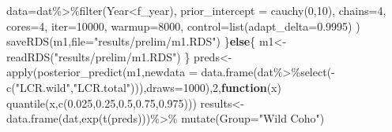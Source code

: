 \documentclass[
]{article}
\newenvironment{Shaded}{\begin{snugshade}}{\end{snugshade}}
\newcommand{\AttributeTok}[1]{\textcolor[rgb]{0.77,0.63,0.00}{#1}}
\newcommand{\ControlFlowTok}[1]{\textcolor[rgb]{0.13,0.29,0.53}{\textbf{#1}}}
\newcommand{\DecValTok}[1]{\textcolor[rgb]{0.00,0.00,0.81}{#1}}
\newcommand{\FloatTok}[1]{\textcolor[rgb]{0.00,0.00,0.81}{#1}}
\newcommand{\FunctionTok}[1]{\textcolor[rgb]{0.00,0.00,0.00}{#1}}
\newcommand{\NormalTok}[1]{#1}
\newcommand{\OtherTok}[1]{\textcolor[rgb]{0.56,0.35,0.01}{#1}}
\newcommand{\SpecialCharTok}[1]{\textcolor[rgb]{0.00,0.00,0.00}{#1}}
\newcommand{\StringTok}[1]{\textcolor[rgb]{0.31,0.60,0.02}{#1}}
\begin{document}
\begin{Shaded}
\begin{Highlighting}[]
             \AttributeTok{data=}\NormalTok{dat}\SpecialCharTok{\%\textgreater{}\%}\FunctionTok{filter}\NormalTok{(Year}\SpecialCharTok{\textless{}}\NormalTok{f\_year),}
             \AttributeTok{prior\_intercept =} \FunctionTok{cauchy}\NormalTok{(}\DecValTok{0}\NormalTok{,}\DecValTok{10}\NormalTok{),}
             \AttributeTok{chains=}\DecValTok{4}\NormalTok{,}
             \AttributeTok{cores=}\DecValTok{4}\NormalTok{,}
             \AttributeTok{iter=}\DecValTok{10000}\NormalTok{,}
             \AttributeTok{warmup=}\DecValTok{8000}\NormalTok{,}
             \AttributeTok{control=}\FunctionTok{list}\NormalTok{(}\AttributeTok{adapt\_delta=}\FloatTok{0.9995}\NormalTok{)}
\NormalTok{  )}
  \FunctionTok{saveRDS}\NormalTok{(m1,}\AttributeTok{file=}\StringTok{"results/prelim/m1.RDS"}\NormalTok{)}
\NormalTok{\}}\ControlFlowTok{else}\NormalTok{\{}
\NormalTok{    m1}\OtherTok{\textless{}{-}}\FunctionTok{readRDS}\NormalTok{(}\StringTok{"results/prelim/m1.RDS"}\NormalTok{)}
\NormalTok{  \}}
\NormalTok{preds}\OtherTok{\textless{}{-}}\FunctionTok{apply}\NormalTok{(}\FunctionTok{posterior\_predict}\NormalTok{(m1,}\AttributeTok{newdata =} \FunctionTok{data.frame}\NormalTok{(dat}\SpecialCharTok{\%\textgreater{}\%}\FunctionTok{select}\NormalTok{(}\SpecialCharTok{{-}}\FunctionTok{c}\NormalTok{(}\StringTok{"LCR.wild"}\NormalTok{,}\StringTok{"LCR.total"}\NormalTok{))),}\AttributeTok{draws=}\DecValTok{1000}\NormalTok{),}\DecValTok{2}\NormalTok{,}\ControlFlowTok{function}\NormalTok{(x) }\FunctionTok{quantile}\NormalTok{(x,}\FunctionTok{c}\NormalTok{(}\FloatTok{0.025}\NormalTok{,}\FloatTok{0.25}\NormalTok{,}\FloatTok{0.5}\NormalTok{,}\FloatTok{0.75}\NormalTok{,}\FloatTok{0.975}\NormalTok{)))}
\NormalTok{results}\OtherTok{\textless{}{-}}\FunctionTok{data.frame}\NormalTok{(dat,}\FunctionTok{exp}\NormalTok{(}\FunctionTok{t}\NormalTok{(preds)))}\SpecialCharTok{\%\textgreater{}\%}
  \FunctionTok{mutate}\NormalTok{(}\AttributeTok{Group=}\StringTok{"Wild Coho"}\NormalTok{)}


\end{Highlighting}
\end{Shaded}
\end{document}
